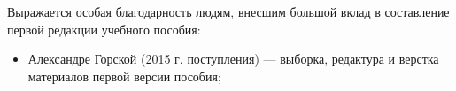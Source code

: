 Выражается особая благодарность людям, внесшим большой вклад в составление первой редакции  учебного пособия:

\begin{itemize}

	\item Александре Горской (2015 г. поступления) --- выборка, редактура и верстка 		материалов первой версии пособия;
	
	
\end{itemize}
 